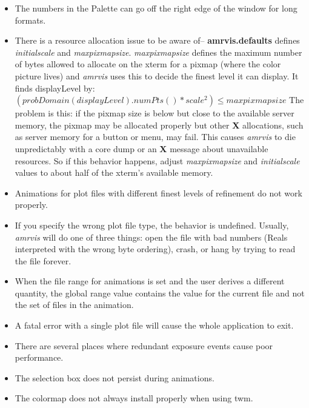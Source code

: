 \begin{itemize}
\item The numbers in the Palette can go off the right edge of the window
for long formats.

\item There is a resource allocation issue to be aware of--
{\bf amrvis.defaults} defines {\em initialscale} and {\em maxpixmapsize}.
{\em maxpixmapsize} defines the maximum number of bytes allowed to allocate
on the xterm for a pixmap (where the color picture lives) and {\em amrvis}
uses this to decide the finest level it can display.  It finds displayLevel
by:  \( (probDomain(displayLevel).numPts() * {scale^{2}}) \leq maxpixmapsize \)
The problem is this:  if the pixmap size is below but close to the
available server memory, the pixmap may be allocated properly but other
{\bf X} allocations, such as server memory for a button or menu, may fail.
This causes {\em amrvis} to die unpredictably with a core dump or an {\bf X}
message about unavailable resources.  So if this behavior happens, adjust
{\em maxpixmapsize} and {\em initialscale} values to about half
of the xterm's available memory.

\item Animations for plot files with different finest levels of refinement
do not work properly.
  
\item If you specify the wrong plot file type, the behavior is undefined.
Usually, {\em amrvis} will do one of three things:  open the file with
bad numbers (Reals interpreted with the wrong byte ordering), crash, or
hang by trying to read the file forever.
  
\item When the file range for animations is set and the user derives
a different quantity, the global range value contains the value for
the current file and not the set of files in the animation.
  
\item A fatal error with a single plot file will cause the whole application
to exit.
  
\item There are several places where redundant exposure events cause poor
performance.
  
\item The selection box does not persist during animations.

\item The colormap does not always install properly when using twm.

\end{itemize}
